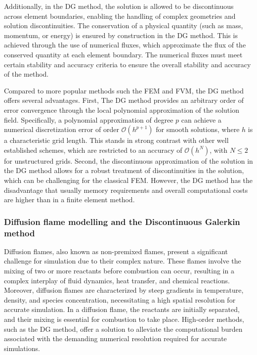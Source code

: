 Additionally, in the DG method, the solution is allowed to be discontinuous across element boundaries, enabling the handling of complex geometries and solution discontinuities. The conservation of a physical quantity (such as mass, momentum, or energy)  is ensured by construction in the DG method. This is achieved through the use of numerical fluxes, which approximate the flux of the conserved quantity at each element boundary. The numerical fluxes must meet certain stability and accuracy criteria to ensure the overall stability and accuracy of the method. 


Compared to more popular methods such the \gls{FEM} and \gls{FVM}, the DG method offers several advantages. First, The DG method provides an arbitrary order of error convergence through the local polynomial approximation of the solution field. Specifically, a polynomial approximation of degree $p$ can achieve a numerical discretization error of order $\mathcal{O}(h^{p+1})$ for smooth solutions, where $h$ is a characteristic grid length. This stands in strong contrast with other well established schemes, which are restricted to an accuracy of $\mathcal{O}(h^N)$, with $N \leq 2$ for unstructured grids. Second, the discontinuous approximation of the solution in the DG method allows for a robust treatment of discontinuities in the solution, which can be challenging for the classical \gls{FEM}. However, the DG method has the disadvantage that usually memory requirements  and overall computational costs are higher than in a finite element method.

\subsubsection{Diffusion flame modelling and the Discontinuous Galerkin method}
Diffusion flames, also known as non-premixed flames, present a significant challenge for simulation due to their complex nature. These flames involve the mixing of two or more reactants before combustion can occur, resulting in a complex interplay of fluid dynamics, heat transfer, and chemical reactions. Moreover, diffusion flames are characterized by steep gradients in temperature, density, and species concentration, necessitating a high spatial resolution for accurate simulation. In a diffusion flame, the reactants are initially separated, and their mixing is essential for combustion to take place. High-order methods, such as the DG method, offer a solution to alleviate the computational burden associated with the demanding numerical resolution required for accurate simulations.
 
